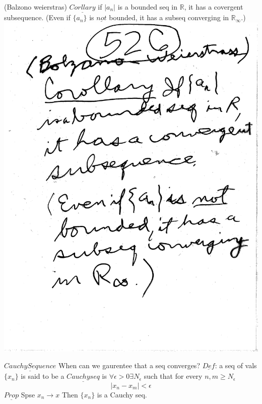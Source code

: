 \documentclass[10pt,a4paper]{article}
\begin{document}
\newpage 
(Balzono weierstras) $\underline{Corllary}$ if $|a_n|$ is a bounded seq in $\mathbb{R}$, it has a covergent subsequence. (Even if $\{ a_n \}$ is $\underline{not}$ bounded, it has a subseq converging in $\mathbb{R}_\infty$.)
\includegraphics[scale=.5]{Pages/LC_9}

\newpage
$\underline{Cauchy Sequence}$ When can we gaurentee that a seq converges? $\underline{Def}$: a seq of vals $\{ x_n \}$ is said to be a $\underline{Cauchy seq}$ is $\forall \epsilon > 0 \exists N_\epsilon$ such that for every $n,m \geq N_\epsilon$ $$|x_n - x_m| < \epsilon$$ 
$\underline{Prop}$ Spse $x_n \rightarrow x$ Then $\{ x_n \}$ is a Cauchy seq.
\end{document}
